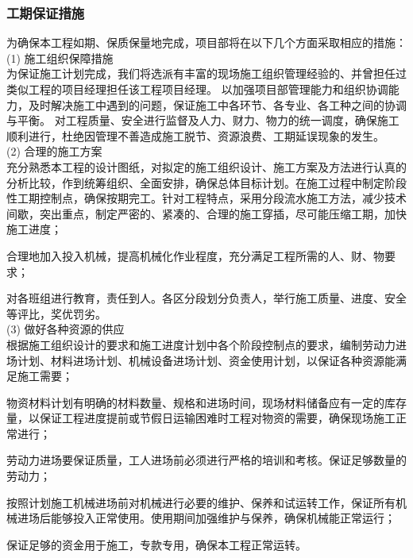 \clearpage
\subsubsection{工期保证措施}

为确保本工程如期、保质保量地完成，项目部将在以下几个方面采取相应的措施：\\

(1) 施工组织保障措施\\

为保证施工计划完成，我们将选派有丰富的现场施工组织管理经验的、并曾担任过类似工程的项目经理担任该工程项目经理。
以加强项目部管理能力和组织协调能力，及时解决施工中遇到的问题，保证施工中各环节、各专业、各工种之间的协调与平衡。
对工程质量、安全进行监督及人力、财力、物力的统一调度，确保施工顺利进行，杜绝因管理不善造成施工脱节、资源浪费、工期延误现象的发生。\\

(2) 合理的施工方案\\

 充分熟悉本工程的设计图纸，对拟定的施工组织设计、施工方案及方法进行认真的分析比较，作到统筹组织、全面安排，确保总体目标计划。在施工过程中制定阶段性工期控制点，确保按期完工。针对工程特点，采用分段流水施工方法，减少技术间歇，突出重点，制定严密的、紧凑的、合理的施工穿插，尽可能压缩工期，加快施工进度；

 合理地加入投入机械，提高机械化作业程度，充分满足工程所需的人、财、物要求；

 对各班组进行教育，责任到人。各区分段划分负责人，举行施工质量、进度、安全等评比，奖优罚劣。\\

(3) 做好各种资源的供应\\

 根据施工组织设计的要求和施工进度计划中各个阶段控制点的要求，编制劳动力进场计划、材料进场计划、机械设备进场计划、资金使用计划，以保证各种资源能满足施工需要；

 物资材料计划有明确的材料数量、规格和进场时间，现场材料储备应有一定的库存量，以保证工程进度提前或节假日运输困难时工程对物资的需要，确保现场施工正常进行；

 劳动力进场要保证质量，工人进场前必须进行严格的培训和考核。保证足够数量的劳动力；

 按照计划施工机械进场前对机械进行必要的维护、保养和试运转工作，保证所有机械进场后能够投入正常使用。使用期间加强维护与保养，确保机械能正常运行；

 保证足够的资金用于施工，专款专用，确保本工程正常运转。\\

